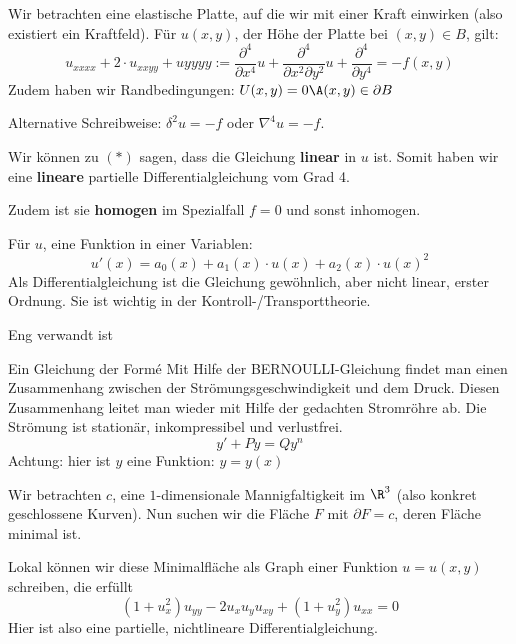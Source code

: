 \documentclass[main.tex]{subfiles}
\begin{document}
\begin{Beispiel}
  Wir betrachten eine elastische Platte, auf die wir mit einer Kraft einwirken (also existiert ein Kraftfeld).
  Für $u(x,y)$, der Höhe der Platte bei $(x,y) \in B$, gilt:
  \begin{equation*}
    u_{xxxx} + 2 \cdot u_{xxyy} + u{yyyy} := \dfrac{\partial^4}{\partial x^4} u + \dfrac{\partial^4}{\partial x^2 \partial y^2} u + \dfrac{\partial^4}{\partial y^4}= -f(x,y) \tag{*}
  \end{equation*}
  Zudem haben wir Randbedingungen: $U(x,y) = 0 \A (x,y) \in \partial B$

  Alternative Schreibweise: $\delta^2 u = -f$ oder $\nabla^4 u = -f$.

  Wir können zu $(*)$ sagen, dass die Gleichung \textbf{linear} in $u$ ist. Somit haben wir eine \textbf{lineare} partielle Differentialgleichung vom Grad 4.

  Zudem ist sie \textbf{homogen} im Spezialfall $f = 0$ und sonst inhomogen.
\end{Beispiel}

\begin{Beispiel}
  Für $u$, eine Funktion in einer Variablen:
  $$u'(x) = a_0(x) + a_1(x) \cdot u(x) + a_2(x) \cdot u(x)^2$$
  Als Differentialgleichung ist die Gleichung gewöhnlich, aber nicht linear, erster Ordnung.
  Sie ist wichtig in der Kontroll-/Transporttheorie.
\end{Beispiel}
Eng verwandt ist

\begin{Beispiel}
  Ein Gleichung der Formé Mit Hilfe der BERNOULLI-Gleichung findet man einen Zusammenhang zwischen der Strömungsgeschwindigkeit und dem Druck. Diesen Zusammenhang leitet man wieder mit Hilfe der gedachten Stromröhre ab. Die Strömung ist stationär, inkompressibel und verlustfrei.
  $$y' + Py = Qy^n$$
  Achtung: hier ist $y$ eine Funktion: $y = y(x)$
\end{Beispiel}

\begin{Beispiel}
  Wir betrachten $c$, eine $1$-dimensionale Mannigfaltigkeit im $\R^3$ (also konkret geschlossene Kurven). Nun suchen wir die Fläche $F$ mit $\partial F = c$, deren Fläche minimal ist.

  Lokal können wir diese Minimalfläche als Graph einer Funktion $u = u(x,y)$ schreiben, die erfüllt
  $$(1 + u_x^2) u_{yy} - 2u_x u_y u_{xy} + (1+u_y^2)u_{xx} = 0$$
  Hier ist also eine partielle, nichtlineare Differentialgleichung.
\end{Beispiel}
\end{document}
